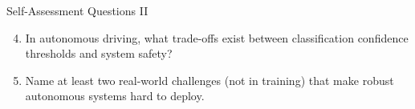 \documentclass[10pt]{beamer}
\begin{document}
\begin{frame}{Self-Assessment Questions II}
    \begin{enumerate}
        \setcounter{enumi}{3}
        \item In autonomous driving, what trade-offs exist between classification confidence thresholds and system safety?
        \item Name at least two real-world challenges (not in training) that make robust autonomous systems hard to deploy.
    \end{enumerate}
\end{frame}
\end{document}

